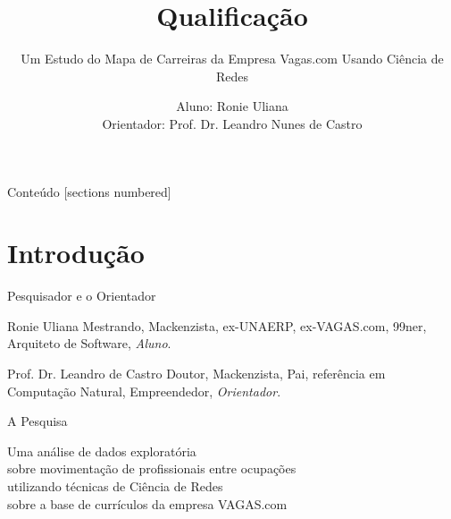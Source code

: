 \documentclass[10pt, hyperref={pdfpagelabels=false}]{beamer}
\title{Qualificação}
\subtitle{Um Estudo do Mapa de Carreiras da Empresa Vagas.com Usando Ciência de Redes}
\date{}
\author{Aluno: Ronie Uliana \\ Orientador: Prof. Dr. Leandro Nunes de Castro}
\institute{Universidade Presbiteriana Mackenzie}
\begin{document}
\maketitle

\begin{frame}{Conteúdo}
  [sections numbered]
  \tableofcontents[hideallsubsections]
\end{frame}

\section{Introdução}

\begin{frame}[fragile, label=pessoas]{Pesquisador e o Orientador}

  \begin{alertblock}{Ronie Uliana}
    Mestrando, Mackenzista, ex-UNAERP, ex-VAGAS.com, 99ner, Arquiteto de Software, \textit{Aluno}.
  \end{alertblock}
  
  \begin{alertblock}{Prof. Dr. Leandro de Castro}
    Doutor, Mackenzista, Pai, referência em Computação Natural, Empreendedor, \textit{Orientador}.
  \end{alertblock}
\end{frame}

\begin{frame}[fragile, label=pesquisa]{A Pesquisa}
  \begin{center}
    \large
    Uma \alert{análise de dados exploratória}\\
    sobre movimentação de profissionais entre ocupações\\
    utilizando técnicas de \alert{Ciência de Redes}\\
    sobre a base de currículos da empresa VAGAS.com
  \end{center}
\end{frame}
\end{document}
